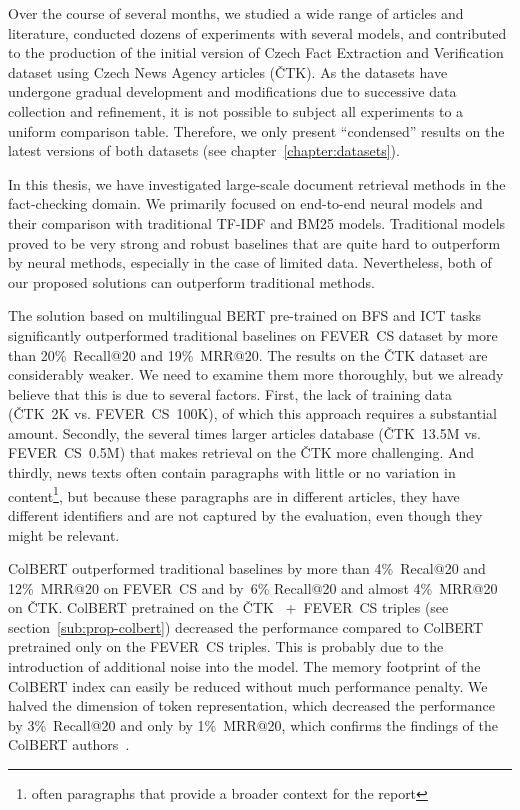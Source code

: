 \begin{conclusion}
\label{section:conclusion}
    Over the course of several months, we studied a wide range of articles and literature, conducted dozens of experiments with several models, and contributed to the production of the initial version of Czech Fact Extraction and Verification dataset using Czech News Agency articles (ČTK). As the datasets have undergone gradual development and modifications due to successive data collection and refinement, it is not possible to subject all experiments to a uniform comparison table. Therefore, we only present \enquote{condensed} results on the latest versions of both datasets (see chapter~\ref{chapter:datasets}).

    In this thesis, we have investigated large-scale document retrieval methods in the fact-checking domain. We primarily focused on end-to-end neural models and their comparison with traditional TF-IDF and BM25 models. Traditional models proved to be very strong and robust baselines that are quite hard to outperform by neural methods, especially in the case of limited data. Nevertheless, both of our proposed solutions can outperform traditional methods.
    
    The solution based on multilingual BERT pre-trained on BFS and ICT tasks significantly outperformed traditional baselines on FEVER~CS dataset by more than 20\%~Recall@20 and 19\%~MRR@20. The results on the ČTK dataset are considerably weaker. We need to examine them more thoroughly, but we already believe that this is due to several factors. First, the lack of training data (ČTK~2K vs. FEVER~CS~100K), of which this approach requires a substantial amount. Secondly, the several times larger articles database (ČTK~13.5M vs. FEVER~CS~0.5M) that makes retrieval on the ČTK more challenging. And thirdly, news texts often contain paragraphs with little or no variation in content\footnote{often paragraphs that provide a broader context for the report}, but because these paragraphs are in different articles, they have different identifiers and are not captured by the evaluation, even though they might be relevant.
    
    ColBERT outperformed traditional baselines by more than 4\%~Recal@20 and 12\%~MRR@20 on FEVER~CS and by~6\% Recall@20 and almost 4\%~MRR@20 on ČTK. ColBERT pretrained on the ČTK ~+~FEVER~CS triples (see section~\ref{sub:prop-colbert}) decreased the performance compared to ColBERT pretrained only on the FEVER~CS triples. This is probably due to the introduction of additional noise into the model. The memory footprint of the ColBERT index can easily be reduced without much performance penalty. We halved the dimension of token representation, which decreased the performance by 3\%~Recall@20 and only by 1\%~MRR@20, which confirms the findings of the ColBERT authors~\parencite{colbert_2020}.
    

\end{conclusion}
